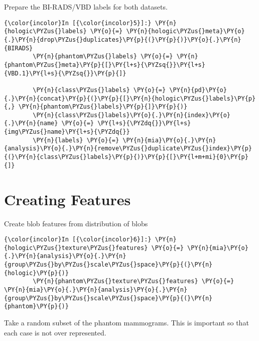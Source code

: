     Prepare the BI-RADS/VBD labels for both datasets.

    \begin{Verbatim}[commandchars=\\\{\}]
{\color{incolor}In [{\color{incolor}5}]:} \PY{n}{hologic\PYZus{}labels} \PY{o}{=} \PY{n}{hologic\PYZus{}meta}\PY{o}{.}\PY{n}{drop\PYZus{}duplicates}\PY{p}{(}\PY{p}{)}\PY{o}{.}\PY{n}{BIRADS}
        \PY{n}{phantom\PYZus{}labels} \PY{o}{=} \PY{n}{phantom\PYZus{}meta}\PY{p}{[}\PY{l+s}{\PYZsq{}}\PY{l+s}{VBD.1}\PY{l+s}{\PYZsq{}}\PY{p}{]}

        \PY{n}{class\PYZus{}labels} \PY{o}{=} \PY{n}{pd}\PY{o}{.}\PY{n}{concat}\PY{p}{(}\PY{p}{[}\PY{n}{hologic\PYZus{}labels}\PY{p}{,} \PY{n}{phantom\PYZus{}labels}\PY{p}{]}\PY{p}{)}
        \PY{n}{class\PYZus{}labels}\PY{o}{.}\PY{n}{index}\PY{o}{.}\PY{n}{name} \PY{o}{=} \PY{l+s}{\PYZdq{}}\PY{l+s}{img\PYZus{}name}\PY{l+s}{\PYZdq{}}
        \PY{n}{labels} \PY{o}{=} \PY{n}{mia}\PY{o}{.}\PY{n}{analysis}\PY{o}{.}\PY{n}{remove\PYZus{}duplicate\PYZus{}index}\PY{p}{(}\PY{n}{class\PYZus{}labels}\PY{p}{)}\PY{p}{[}\PY{l+m+mi}{0}\PY{p}{]}
\end{Verbatim}

    \section{Creating Features}\label{creating-features}

    Create blob features from distribution of blobs

    \begin{Verbatim}[commandchars=\\\{\}]
{\color{incolor}In [{\color{incolor}6}]:} \PY{n}{hologic\PYZus{}texture\PYZus{}features} \PY{o}{=} \PY{n}{mia}\PY{o}{.}\PY{n}{analysis}\PY{o}{.}\PY{n}{group\PYZus{}by\PYZus{}scale\PYZus{}space}\PY{p}{(}\PY{n}{hologic}\PY{p}{)}
        \PY{n}{phantom\PYZus{}texture\PYZus{}features} \PY{o}{=} \PY{n}{mia}\PY{o}{.}\PY{n}{analysis}\PY{o}{.}\PY{n}{group\PYZus{}by\PYZus{}scale\PYZus{}space}\PY{p}{(}\PY{n}{phantom}\PY{p}{)}
\end{Verbatim}

    Take a random subset of the phantom mammograms. This is important so
that each case is not over represented.

